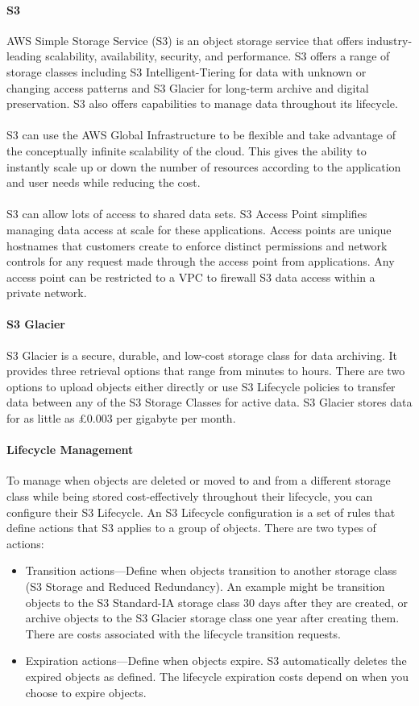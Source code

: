 \documentclass[10pt]{article}
\begin{document}
\paragraph{S3}
AWS Simple Storage Service (S3) \cite{S3} is an object storage service that offers industry-leading scalability, availability, security, and performance. S3 offers a range of storage classes including S3 Intelligent-Tiering for data with unknown or changing access patterns and S3 Glacier for long-term archive and digital preservation. S3 also offers capabilities to manage data throughout its lifecycle. \\ \\
S3 can use the AWS Global Infrastructure to be flexible and take advantage of the conceptually infinite scalability of the cloud. This gives the ability to instantly scale up or down the number of resources according to the application and user needs while reducing the cost. \\ \\
S3 can allow lots of access to shared data sets. S3 Access Point simplifies managing data access at scale for these applications. Access points are unique hostnames that customers create to enforce distinct permissions and network controls for any request made through the access point from applications. Any access point can be restricted to a VPC to firewall S3 data access within a private network. \\
\paragraph{S3 Glacier}
S3 Glacier\cite{S3-glacier} is a secure, durable, and low-cost storage class for data archiving. It provides three retrieval options that range from minutes to hours. There are two options to upload objects either directly or use S3 Lifecycle policies to transfer data between any of the S3 Storage Classes for active data. S3 Glacier stores data for as little as £0.003 per gigabyte per month.
\paragraph{Lifecycle Management}
To manage when objects are deleted or moved to and from a different storage class while being stored cost-effectively throughout their lifecycle, you can configure their S3 Lifecycle\cite{S3-lifecycle}. An S3 Lifecycle configuration is a set of rules that define actions that S3 applies to a group of objects. There are two types of actions:
\begin{itemize}
  \item Transition actions—Define when objects transition to another storage class (S3 Storage and Reduced Redundancy). An example might be transition objects to the S3 Standard-IA storage class 30 days after they are created, or archive objects to the S3 Glacier storage class one year after creating them. There are costs associated with the lifecycle transition requests. 
  \item Expiration actions—Define when objects expire. S3 automatically deletes the expired objects as defined. The lifecycle expiration costs depend on when you choose to expire objects. 
  \end{itemize}
\end{document}
